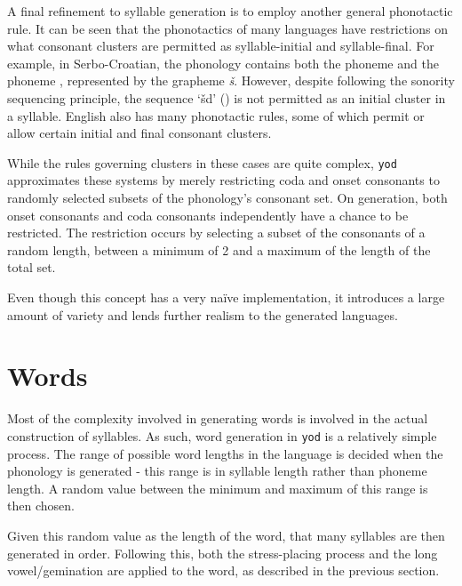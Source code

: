 \documentclass{report}
\begin{document}
	A final refinement to syllable generation is to employ another general phonotactic rule. It can be seen that the phonotactics of many languages have restrictions on what consonant clusters are permitted as syllable-initial and syllable-final. For example, in Serbo-Croatian, the phonology contains both the phoneme  and the phoneme , represented by the grapheme \textit{\v{s}}. However, despite following the sonority sequencing principle, the sequence `\v{s}d' () is not permitted as an initial cluster in a syllable\cite{uzelac1971phonological}. English also has many phonotactic rules, some of which permit or allow certain initial and final consonant clusters\cite{chomsky1968sound}.
	
	While the rules governing clusters in these cases are quite complex, \texttt{yod} approximates these systems by merely restricting coda and onset consonants to randomly selected subsets of the phonology's consonant set. On generation, both onset consonants and coda consonants independently have a chance to be restricted. The restriction occurs by selecting a subset of the consonants of a random length, between a minimum of 2 and a maximum of the length of the total set.
	
	Even though this concept has a very na\"{i}ve implementation, it introduces a large amount of variety and lends further realism to the generated languages.
	
	\section{Words}
	\label{section: words}
	
	Most of the complexity involved in generating words is involved in the actual construction of syllables. As such, word generation in \texttt{yod} is a relatively simple process. The range of possible word lengths in the language is decided when the phonology is generated - this range is in syllable length rather than phoneme length. A random value between the minimum and maximum of this range is then chosen.
	
	Given this random value as the length of the word, that many syllables are then generated in order. Following this, both the stress-placing process and the long vowel/gemination are applied to the word, as described in the previous section. 
	
\end{document}
